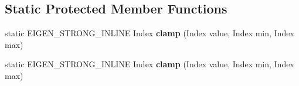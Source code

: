 \subsection*{Static Protected Member Functions}
\begin{DoxyCompactItemize}
\item 
\mbox{\label{struct_eigen_1_1_tensor_evaluator_3_01const_01_tensor_striding_slicing_op_3_01_start_indices_00_cee1ff5835d6d215dedc4ac8d5000be4_ac73ab094cd9b969ee5e9ca152ecdd35b}} 
static E\+I\+G\+E\+N\+\_\+\+S\+T\+R\+O\+N\+G\+\_\+\+I\+N\+L\+I\+NE Index {\bfseries clamp} (Index value, Index min, Index max)
\item 
\mbox{\label{struct_eigen_1_1_tensor_evaluator_3_01const_01_tensor_striding_slicing_op_3_01_start_indices_00_cee1ff5835d6d215dedc4ac8d5000be4_ac73ab094cd9b969ee5e9ca152ecdd35b}} 
static E\+I\+G\+E\+N\+\_\+\+S\+T\+R\+O\+N\+G\+\_\+\+I\+N\+L\+I\+NE Index {\bfseries clamp} (Index value, Index min, Index max)
\end{DoxyCompactItemize}
